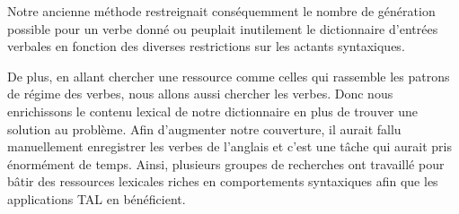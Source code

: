 Notre ancienne méthode restreignait conséquemment le nombre de génération possible pour un verbe donné ou peuplait inutilement le dictionnaire d'entrées verbales en fonction des diverses restrictions sur les actants syntaxiques.

De plus, en allant chercher une ressource comme celles qui rassemble les patrons de régime des verbes, nous allons aussi chercher les verbes. Donc nous enrichissons le contenu lexical de notre dictionnaire en plus de trouver une solution au problème. Afin d'augmenter notre couverture, il aurait fallu manuellement enregistrer les verbes de l'anglais et c'est une tâche qui aurait pris énormément de temps. Ainsi, plusieurs groupes de recherches ont travaillé pour bâtir des ressources lexicales riches en comportements syntaxiques afin que les applications \ac{TAL} en bénéficient.
